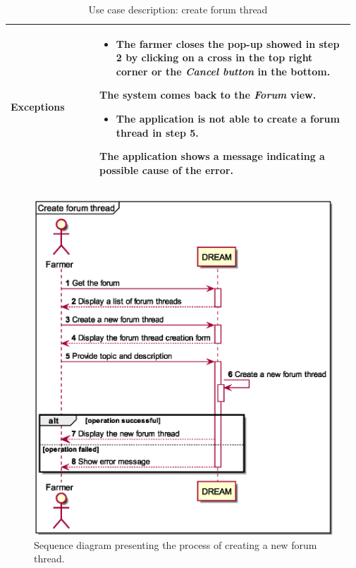 \begin{table}[H]
\begin{tabular}{@{}p{0.25\linewidth} p{0.72\linewidth}@{}}
		\textbf{Exceptions}         & \begin{itemize}[leftmargin=.4cm,noitemsep,topsep=0pt,before=\vspace{-3mm}]
		   \item The farmer closes the pop-up showed in step 2 by clicking on a cross in the top right corner or the \textit{Cancel button} in the bottom.
		\end{itemize}
	    The system comes back to the \textit{Forum} view.
	    \begin{itemize}[leftmargin=.4cm,noitemsep,topsep=0pt]
		   \item The application is not able to create a forum thread in step 5. 
		\end{itemize}
		The application shows a message indicating a possible cause of the error.
        \\\bottomrule
	\end{tabular}
	\caption{Use case description: create forum thread} 
\end{table}

\begin{figure}[H]
    \centering
    \includegraphics[scale=0.6, keepaspectratio, origin=c]{diagrams/sequence/create_forum_thread}
    \caption{Sequence diagram presenting the process of creating a new forum thread.}
    \label{fig:sd_create_forum_thread}
\end{figure}

